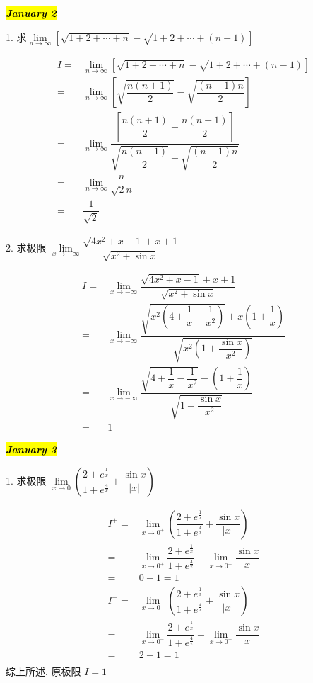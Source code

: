 \hl{\textbf{\textit{January 2}}}

1. 求$\lim\limits_{n\to\infty}\left[\sqrt{1+2+\cdots+n}-\sqrt{1+2+\cdots+(n-1)}\right]$
\begin{solution}

	\begin{align*}
		I = & \lim\limits_{n\to\infty}\left[\sqrt{1+2+\cdots+n}-\sqrt{1+2+\cdots+(n-1)}\right]\\
		  = & \lim\limits_{n\to\infty}\left[\sqrt{\dfrac{n(n+1)}{2}}-\sqrt{\dfrac{(n-1)n}{2}}\right]\\
		  = & \lim\limits_{n\to\infty}\dfrac{\left[\dfrac{n(n+1)}{2}-\dfrac{n(n-1)}{2}\right]}{\sqrt{\dfrac{n(n+1)}{2}}+\sqrt{\dfrac{(n-1)n}{2}}}\\
		  = & \lim\limits_{n\to\infty}\dfrac{n}{\sqrt{2}n}\\
		  = & \dfrac{1}{\sqrt{2}} 
	\end{align*}
\end{solution}

2. 求极限 $\lim\limits_{x\to-\infty}\dfrac{\sqrt{4x^{2}+x-1}+x+1}{\sqrt{x^{2}+\sin x}}$
\begin{solution}

	\begin{align*}
		I = & \lim\limits_{x\to-\infty}\dfrac{\sqrt{4x^{2}+x-1}+x+1}{\sqrt{x^{2}+\sin x}}\\
		  = & \lim\limits_{x\to-\infty}\dfrac{\sqrt{x^{2}(4+\dfrac{1}{x}-\dfrac{1}{x^{2}})}+x(1+\dfrac{1}{x})}{\sqrt{x^{2}(1+\dfrac{\sin x}{x^{2}})}}\\
		  = & \lim\limits_{x\to-\infty}\dfrac{\sqrt{4+\dfrac{1}{x}-\dfrac{1}{x^{2}}}-(1+\dfrac{1}{x})}{\sqrt{1+\dfrac{\sin x}{x^{2}}}}\\
		  = & 1
	\end{align*}
\end{solution}

\hl{\textbf{\textit{January 3}}}

1. 求极限 $\lim\limits_{x\to 0}\left(\dfrac{2+e^{\frac{1}{x}}}{1+e^{\frac{4}{x}}}+\dfrac{\sin x}{|x|}\right)$
\begin{solution}

	\begin{align*}
		I^{+} = & \lim\limits_{x\to 0^{+}}\left(\dfrac{2+e^{\frac{1}{x}}}{1+e^{\frac{4}{x}}}+\dfrac{\sin x}{|x|}\right)\\
		      = & \lim\limits_{x\to 0^{+}}\dfrac{2+e^{\frac{1}{x}}}{1+e^{\frac{4}{x}}}+\lim\limits_{x\to 0^{+}}\dfrac{\sin x}{x}\\
			  = & 0+1 = 1\\
		I^{-} = & \lim\limits_{x\to 0^{-}}\left(\dfrac{2+e^{\frac{1}{x}}}{1+e^{\frac{4}{x}}}+\dfrac{\sin x}{|x|}\right)\\
			  = & \lim\limits_{x\to 0^{-}}\dfrac{2+e^{\frac{1}{x}}}{1+e^{\frac{4}{x}}}-\lim\limits_{x\to 0^{-}}\dfrac{\sin x}{x}\\
			  = & 2-1 = 1\\
	\end{align*}
	综上所述, 原极限 $I =1$
\end{solution}

